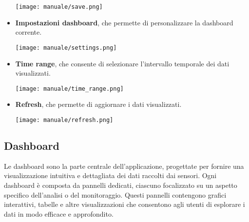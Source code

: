 \begin{itemize}
        \begin{center}
            \texttt{[image: manuale/save.png]}
        \end{center}
    \item \textbf{Impostazioni dashboard}, che permette di personalizzare la dashboard corrente.
        \begin{center}
            \texttt{[image: manuale/settings.png]}
        \end{center}
    \newpage
    \item \textbf{Time range}, che consente di selezionare l'intervallo temporale dei dati visualizzati.
        \begin{center}
            \texttt{[image: manuale/time\_range.png]}
        \end{center}
    \item \textbf{Refresh}, che permette di aggiornare i dati visualizzati.
        \begin{center}
            \texttt{[image: manuale/refresh.png]}
        \end{center}
\end{itemize}
\newpage
\subsection{Dashboard}
Le dashboard sono la parte centrale dell'applicazione, progettate per fornire una visualizzazione intuitiva e dettagliata dei dati raccolti dai sensori. Ogni dashboard è composta da pannelli dedicati, ciascuno focalizzato su un aspetto specifico dell'analisi o del monitoraggio. Questi pannelli contengono grafici interattivi, tabelle e altre visualizzazioni che consentono agli utenti di esplorare i dati in modo efficace e approfondito.


